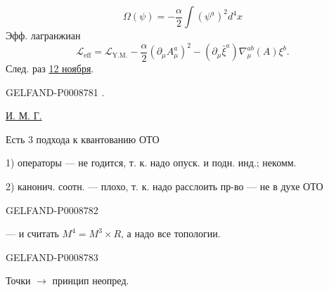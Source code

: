 \begin{equation*}
\Omega(\psi)=-\frac\alpha2\int(\psi^a)^2d^4x
\tag{62}
\end{equation*}
Эфф. лагранжиан
\begin{equation*}
\mathcal L_{\mathrm{eff}}=\mathcal L_{\mathrm{Y.M.}}-\frac\alpha2(\partial_\mu A_\mu^a)^2
-(\partial_\mu\bar\xi^a)\nabla_\mu^{ab}(A)\xi^b.
\tag{63}
\end{equation*}
След. раз \uline{12 ноября}.


\begin{GelfandAdjacentEvidence}{GELFAND-P000878}{1}
\quad {}.

\uline{И. М. Г.}\qquad {}

Есть 3 подхода к квантованию ОТО

1) операторы --- не годится, т. к. надо опуск. и подн. инд.; некомм.

2) канонич.  соотн. --- плохо, т. к. надо расслоить пр-во --- не в духе ОТО
\end{GelfandAdjacentEvidence}
\begin{GelfandAdjacentEvidence}{GELFAND-P000878}{2}


--- и считать $M^4=M^3\times R$, а надо все топологии.

\end{GelfandAdjacentEvidence}
\begin{GelfandAdjacentEvidence}{GELFAND-P000878}{3}


\end{GelfandAdjacentEvidence}


Точки $\to$ принцип неопред.


